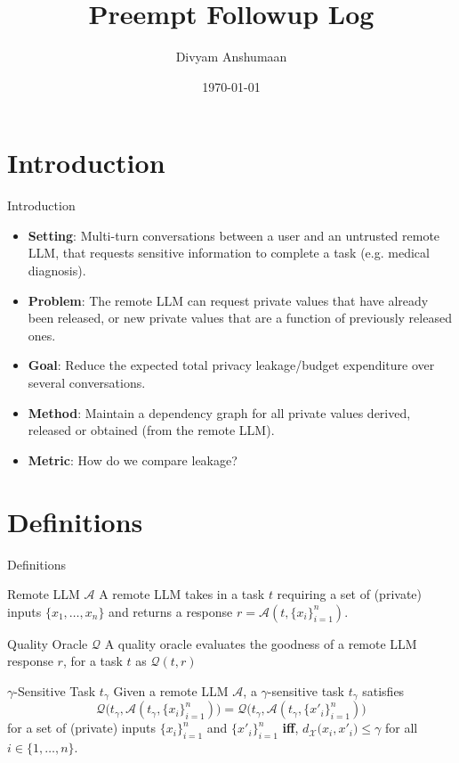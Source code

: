 \documentclass{beamer}
\title[Preempt Followup]{Preempt Followup Log}
\author{Divyam Anshumaan}
\institute{UW-Madison}
\date{\today}
\begin{document}
\begin{frame}
  \titlepage
\end{frame}

\section{Introduction}

\begin{frame}{Introduction}
  \begin{itemize}
    \item \textbf{Setting}: Multi-turn conversations between a user and an untrusted remote LLM, that requests sensitive information to complete a task (e.g. medical diagnosis).
    \item \textbf{Problem}: The remote LLM can request private values that have already been released, or new private values that are a function of previously released ones.
    \item \textbf{Goal}: Reduce the expected total privacy leakage/budget expenditure over several conversations.
    \item \textbf{Method}: Maintain a dependency graph for all private values derived, released or obtained (from the remote LLM).
    \item \textbf{Metric}: How do we compare leakage?
  \end{itemize}
\end{frame}

\section{Definitions}

\begin{frame}{Definitions}
\begin{block}{Remote LLM $\mathcal{A}$}
    A remote LLM takes in a task $t$ requiring a set of (private) inputs $\{x_1,\dots,x_n\}$ and returns a response $r = \mathcal{A}(t, \{x_i\}^n_{i=1})$.
\end{block}
\begin{block}{Quality Oracle $\mathcal{Q}$}
    A quality oracle evaluates the goodness of a remote LLM response $r$, for a task $t$ as $\mathcal{Q}(t, r)$
\end{block}
\begin{block}{$\gamma$-Sensitive Task $t_\gamma$}
    Given a remote LLM $\mathcal{A}$, a $\gamma$-sensitive task $t_\gamma$ satisfies
    \[
    \mathcal{Q}\big(t_\gamma, \mathcal{A}(t_\gamma, \{x_i\}^n_{i=1})\big) = \mathcal{Q}\big(t_\gamma, \mathcal{A}(t_\gamma, \{x'_i\}^n_{i=1})\big)
    \]
    for a set of (private) inputs $\{x_i\}^n_{i=1}$ and $\{x'_i\}^n_{i=1}$ \textbf{iff}, $d_{\mathcal{X}}\big(x_i, x'_i\big) \le \gamma$ for all $i \in \{1,\dots,n\}$.
  \end{block}
\end{frame}
\end{document}
